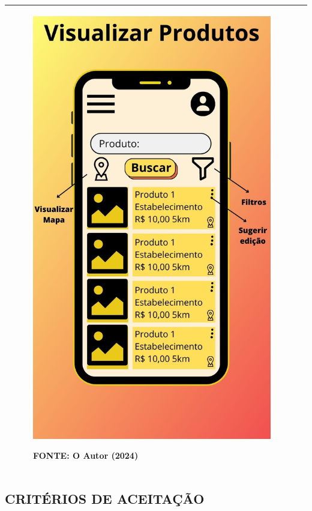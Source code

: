 \begin{tabular}{|ll|}
\begin{minipage}{0.48\textwidth}
\begin{figure}[H]
\includegraphics[width=\textwidth]{fig/telas/t_listarprod.jpg}
\footnotesize \centering
\par FONTE: O Autor (2024)
\end{figure}
\end{minipage}
 \\ \hline
\end{tabular}

\subsection*{\textbf{CRITÉRIOS DE ACEITAÇÃO}}

